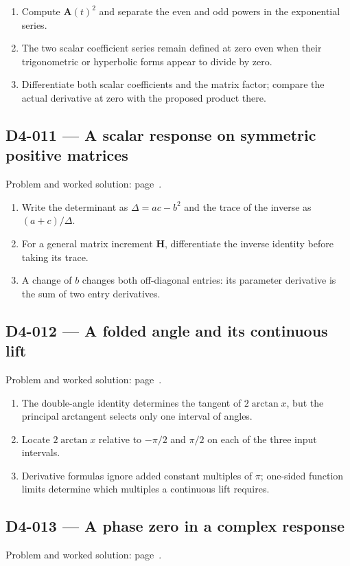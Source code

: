 \documentclass[11pt,oneside,openany]{book}
\begin{document}
\begin{enumerate}
\item Compute \(\mathbf A(t)^2\) and separate the even and odd powers in the exponential series.
\item The two scalar coefficient series remain defined at zero even when their trigonometric or hyperbolic forms appear to divide by zero.
\item Differentiate both scalar coefficients and the matrix factor; compare the actual derivative at zero with the proposed product there.
\end{enumerate}
\subsection*{D4-011 --- A scalar response on symmetric positive matrices}
\label{hints:D4-011}
Problem and worked solution: page~\pageref{problem:D4-011}.

\begin{enumerate}
\item Write the determinant as \(\Delta=ac-b^2\) and the trace of the inverse as \((a+c)/\Delta\).
\item For a general matrix increment \(\mathbf H\), differentiate the inverse identity before taking its trace.
\item A change of \(b\) changes both off-diagonal entries: its parameter derivative is the sum of two entry derivatives.
\end{enumerate}
\subsection*{D4-012 --- A folded angle and its continuous lift}
\label{hints:D4-012}
Problem and worked solution: page~\pageref{problem:D4-012}.

\begin{enumerate}
\item The double-angle identity determines the tangent of \(2\arctan x\), but the principal arctangent selects only one interval of angles.
\item Locate \(2\arctan x\) relative to \(-\pi/2\) and \(\pi/2\) on each of the three input intervals.
\item Derivative formulas ignore added constant multiples of \(\pi\); one-sided function limits determine which multiples a continuous lift requires.
\end{enumerate}
\subsection*{D4-013 --- A phase zero in a complex response}
\label{hints:D4-013}
Problem and worked solution: page~\pageref{problem:D4-013}.
\end{document}
